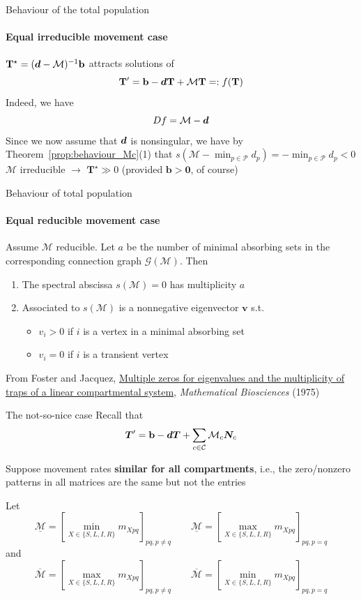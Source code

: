 \documentclass[aspectratio=169]{beamer}\usepackage[]{graphicx}\usepackage[]{xcolor}
\begin{document}
\begin{frame}{Behaviour of the total population}
\framesubtitle{Equal irreducible movement case}
$\mathbf{T}^\star=(\bm{d}-\mathcal{M})^{-1}\mathbf{b}$ attracts solutions of
$$
\mathbf{T}'=\mathbf{b}-\bm{d}\mathbf{T}+\mathcal{M}\mathbf{T}=:f(\mathbf{T})
$$
\vfill
Indeed, we have
$$
Df=\mathcal{M}-\bm{d}
$$
\vfill
Since we now assume that $\bm{d}$ is nonsingular, we have by Theorem~\ref{prop:behaviour_Mc}{(1)} that $s(\mathcal{M}-\min_{p\in\mathcal{P}}d_p)=-\min_{p\in\mathcal{P}}d_p<0$
\vfill
$\mathcal{M}$ irreducible $\rightarrow$ $\mathbf{T}^\star\gg 0$ (provided $\mathbf{b}>\mathbf{0}$, of course)
\end{frame}


\begin{frame}{Behaviour of total population}
\framesubtitle{Equal reducible movement case}
\begin{theorem}
Assume $\mathcal{M}$ reducible. Let $a$ be the number of minimal absorbing sets in the corresponding connection graph $\mathcal{G}(\mathcal{M})$. Then
\begin{enumerate}
	\item The spectral abscissa $s(\mathcal{M})=0$ has multiplicity $a$
	\item Associated to $s(\mathcal{M})$ is a nonnegative eigenvector $\mathbf{v}$ s.t.
	\begin{itemize}
		\item $v_i>0$ if $i$ is a vertex in a minimal absorbing set
		\item $v_i=0$ if $i$ is a transient vertex
	\end{itemize}
\end{enumerate}
\end{theorem}

\vfill
From Foster and Jacquez, \href{https://doi.org/10.1016/0025-5564(75)90096-6}{Multiple zeros for eigenvalues and the multiplicity of traps of a linear compartmental system}, \emph{Mathematical Biosciences} (1975)
\end{frame}


\begin{frame}{The not-so-nice case}
Recall that
$$
\bm{T}'=\mathbf{b}-\bm{d}\bm{T}+\sum_{c\in\mathcal{C}}\mathcal{M}_c\bm{N}_{c}
$$

Suppose movement rates \textbf{similar for all compartments}, i.e., the zero/nonzero patterns in all matrices are the same but not the entries

Let
$$
\underline{\mathcal{M}}=\left[\min_{X\in\{S,L,I,R\}}m_{Xpq}\right]_{pq,p\neq q}\qquad 
\underline{\mathcal{M}}=\left[\max_{X\in\{S,L,I,R\}}m_{Xpq}\right]_{pq,p=q}
$$
and
$$
\overline{\mathcal{M}}=\left[\max_{X\in\{S,L,I,R\}}m_{Xpq}\right]_{pq,p\neq q}\qquad
\overline{\mathcal{M}}=\left[\min_{X\in\{S,L,I,R\}}m_{Xpq}\right]_{pq,p=q}
$$
\end{frame}
\end{document}
